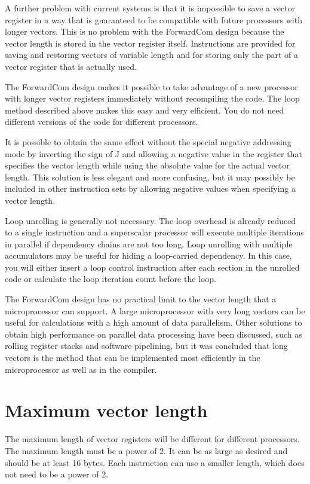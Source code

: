 \documentclass[forwardcom.tex]{subfiles}
\begin{document}
A further problem with current systems is that it is impossible to save a vector register in a way that is guaranteed to be compatible with future processors with longer vectors. This is no problem with the ForwardCom design because the vector length is stored in the vector register itself. Instructions are provided for saving and restoring vectors of variable length and for storing only the part of a vector register that is actually used.
\vv

The ForwardCom design makes it possible to take advantage of a new processor with longer vector registers immediately without recompiling the code. The loop method described above makes this easy and very efficient. You do not need different versions of the code for different processors.
\vv

It is possible to obtain the same effect without the special negative addressing mode by inverting the sign of J and allowing a negative value in the register that specifies the vector length while using the absolute value for the actual vector length. This solution is less elegant and more confusing, but it may possibly be included in other instruction sets by allowing negative values when specifying a vector length.
\vv

Loop unrolling is generally not necessary. The loop overhead is already reduced to a single instruction  and a superscalar processor will execute multiple iterations in parallel if dependency chains are not too long. Loop unrolling with multiple accumulators may be useful for hiding a loop-carried dependency. In this case, you will either insert a loop control instruction after each section in the unrolled code or calculate the loop iteration count before the loop.
\vv

The ForwardCom design has no practical limit to the vector length that a microprocessor can support. A large microprocessor with very long vectors can be useful for calculations with a high amount of data parallelism. Other solutions to obtain high performance on parallel data processing have been discussed, such as rolling register stacks and software pipelining, but it was concluded that long vectors is the method that can be implemented most efficiently in the microprocessor as well as in the compiler.

\section{Maximum vector length}
The maximum length of vector registers will be different for different processors. The maximum length must be a power of 2. It can be as large as desired and should be at least 16 bytes. Each instruction can use a smaller length, which does not need to be a power of 2.
\vv
\end{document}
